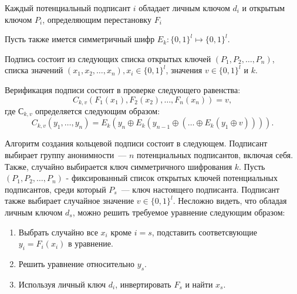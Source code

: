 \documentclass{article}
\begin{document}
Каждый потенциальный подписант $i$ обладает личным ключом $d_i$ и открытым ключом $P_i$,
определяющим перестановку $F_i$

Пусть также имется симметричный шифр $E_k: \{0,1\}^l \mapsto \{0,1\}^l$.

Подпись состоит из следующих списка открытых ключей $(P_1, P_2, \ldots, P_{n})$,
списка значений $(x_1, x_2, \ldots, x_{n}), x_i\in \{0,1\}^l$,
значения $v\in \{0,1\}^l$ и $k$.

Верификация подписи состоит в проверке следующего равенства:
$$
C_{k, v} (F_1(x_1), F_2(x_2), \ldots, F_n(x_n)) = v,
$$
где $С_{k, v}$ определяется следующим образом:
$$
C_{k,v}(y_1, \ldots, y_n) = E_k(y_n \oplus E_k(y_{n-1} \oplus (\ldots \oplus E_k(y_1 \oplus v)))).
$$

Алгоритм создания кольцевой подписи состоит в следующем.
Подписант выбирает группу анонимности~--- $n$ потенциальных подписантов,
включая себя.
Также, случайно выбирается ключ симметричного шифрования $k$.
Пусть $(P_1, P_2, \ldots, P_{n})$ - фиксированный список открытых ключей
потенциальных подписантов, среди который $P_s$~--- ключ настоящего подписанта.
Подписант также выбирает случайное значение $v\in \{0, 1\}^l$.
Несложно видеть, что обладая личным ключом $d_s$,
можно решить требуемое уравнение следующим образом:
\begin{enumerate}
  \item
  Выбрать случайно все $x_i$ кроме $i=s$, подставить соответсвующие $y_i = F_i(x_i)$
  в уравнение.
  \item
  Решить уравнение относительно $y_s$.
  \item
  Используя личный ключ $d_i$, инвертировать $F_s$ и найти $x_s$.
\end{enumerate}


\end{document}
